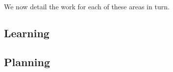 \documentclass[a4paper,11pt,pdf]{pacmanreport}
\begin{document}
We now detail the work for each of these areas in turn.





\subsection{Learning}







\subsection{Planning}






\end{document}
